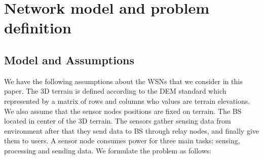 \documentclass[paper.tex]{subfiles}
\begin{document}
	\section{Network model and problem definition} \label{sec:model}
	\subsection{Model and Assumptions}
	We have the following assumptions about the \ac{WSNs} that we consider in this paper. The 3D terrain is defined according to the \ac{DEM} standard which represented by a matrix of rows and columns who values are terrain elevations. We also assume that the sensor nodes positions are fixed on terrain. The \ac{BS} located in center of the 3D terrain. The sensors gather sensing data from environment after that they send data to \ac{BS} through relay nodes, and finally give them to users. A sensor node consumes power for three main tasks: sensing, processing and sending data. We formulate the problem as follows:
	
\end{document}

